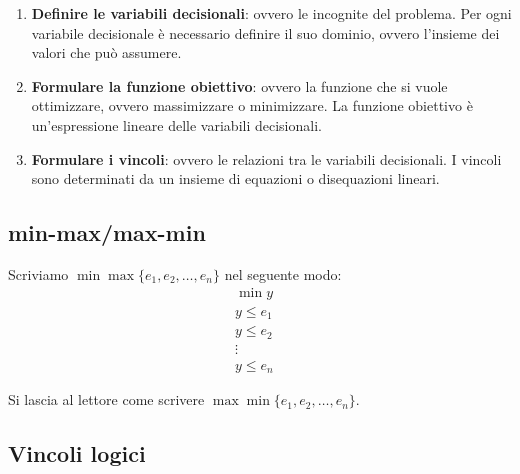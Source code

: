 \documentclass[12pt]{article}
\begin{document}
\begin{enumerate}
	\item \textbf{Definire le variabili decisionali}: ovvero le incognite del
	      problema. Per ogni variabile decisionale è necessario definire il suo
	      dominio, ovvero l'insieme dei valori che può assumere.

	\item \textbf{Formulare la funzione obiettivo}: ovvero la funzione che si
	      vuole ottimizzare, ovvero massimizzare o minimizzare. La funzione
	      obiettivo è un'espressione lineare delle variabili decisionali.

	\item \textbf{Formulare i vincoli}: ovvero le relazioni tra le variabili
	      decisionali. I vincoli sono determinati da un insieme di equazioni o
	      disequazioni lineari.
\end{enumerate}

\subsection{min-max/max-min}

Scriviamo $\min\max \{e_1, e_2, \dots, e_n\}$ nel seguente modo:
\begin{align*}
	\min{y}    & \\
	y \leq e_1 & \\
	y \leq e_2 & \\
	\vdots     & \\
	y \leq e_n &
\end{align*}

Si lascia al lettore come scrivere $\max\min \{e_1, e_2, \dots, e_n\}$.

\subsection{Vincoli logici}
\end{document}
